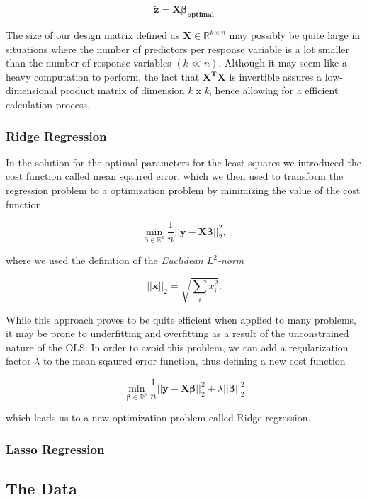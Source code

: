 \documentclass[a4paper, 10pt]{article}
\begin{document}
$$
\boldsymbol{\tilde{z}} = \boldsymbol{X} \boldsymbol{\beta_{optimal}}
$$

The size of our design matrix defined as $\boldsymbol{X}\in {\mathbb{R}}^{k\times n}$ may possibly be quite large in situations where the number of predictors per response variable is a lot smaller than the number of response variables $(k \ll n)$. Although it may seem like a heavy computation to perform, the fact that $\boldsymbol{X^TX}$ is invertible assures a low-dimensional product matrix of dimension \emph{k} x \emph{k}, hence allowing for a efficient calculation process. 

\subsubsection{Ridge Regression}
In the solution for the optimal parameters for the least squares we introduced the cost function called mean sqaured error, which we then used to transform the regression problem to a optimization problem by minimizing the value of the cost function 

$$
{\displaystyle \min_{\boldsymbol{\beta}\in
{\mathbb{R}}^{p}}}\frac{1}{n}\vert\vert \boldsymbol{y}-\boldsymbol{X}\boldsymbol{\beta}\vert\vert_2^2,
$$

where we used the definition of the \emph{Euclidean $L^2$-norm}

$$
\vert\vert \boldsymbol{x}\vert\vert_2 = \sqrt{\sum_i x_i^2}.
$$


While this approach proves to be quite efficient when applied to many problems, it may be prone to underfitting and overfitting as a result of the unconstrained nature of the OLS. In order to avoid this problem, we can add a regularization factor $\lambda$ to the mean sqaured error function, thus defining a new cost function   

$$
{\displaystyle \min_{\boldsymbol{\beta}\in
{\mathbb{R}}^{p}}}\frac{1}{n}\vert\vert \boldsymbol{y}-\boldsymbol{X}\boldsymbol{\beta}\vert\vert_2^2+\lambda\vert\vert \boldsymbol{\beta}\vert\vert_2^2
$$

which leads us to a new optimization problem called Ridge regression. 

\subsubsection{Lasso Regression}

\subsection{The Data}
\end{document}
